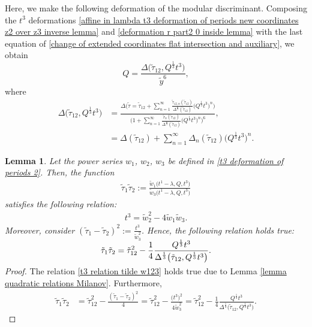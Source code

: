 \documentclass[pdftex]{sigma}
\numberwithin{equation}{section}
\newtheorem{Lemma}[Theorem]{Lemma}
\begin{document}
Here, we make the following deformation of the modular discriminant. Composing the $t^3$ deformations \eqref{affine in lambda t3 deformation of periods new coordinates z2 over z3 inverse lemma} and \eqref{deformation r part2 0 inside lemma} with the last equation of \eqref{change of extended coordinates flat intersection and auxiliary}, we obtain
\[%
Q=\frac{\Delta\bigl(\tilde\tau_{12},Q^{\frac{1}{3}} t^3 \bigr)}{\tilde y^6},
\]
where
\begin{align}
\Delta\bigl(\tilde\tau_{12},Q^{\frac{1}{3}}t^3\bigr)&=\frac{\Delta\bigl(\tilde\tau=\tilde\tau_{12}+\sum_{n=1}^{\infty}\frac{\tilde\tau_{12,n}(\tilde\tau_{12})}{\Delta^{\frac{n}{3}}(\tilde\tau_{12})} \bigl( Q^{\frac{1}{3}}t^3\bigr)^n \bigr)}{\bigl( 1+\sum_{n=1}^{\infty} \frac{\tilde r_n(\tilde\tau_{12})}{\Delta^{\frac{n}{3}}(\tilde\tau_{12})} \bigl( Q^{\frac{1}{3}}t^3 \bigr)^n \bigr)^6},\nonumber\\
&=\Delta(\tilde\tau_{12})+\sum_{n=1}^{\infty} \Delta_n(\tilde\tau_{12})\bigl( Q^{\frac{1}{3}}t^3 \bigr)^n.\label{modular deformation tilde 0}
\end{align}



\begin{Lemma}\label{lemma w1 dependence of t3 e Q root 3}
Let the power series $w_1$, $w_2$, $w_3$ be defined in \eqref{t3 deformation of periods 2}.
Then, the function
\begin{gather*}
\tilde\tau_1\tilde\tau_2:= \frac{\tilde w_1\bigl(t^1-\lambda,Q,t^3\bigr)}{\tilde w_3\bigl(t^1-\lambda,Q,t^3\bigr)}
\end{gather*}
satisfies the following relation:
\begin{gather}\label{t3 relation tilde w123}
t^3=\tilde w_2^2-4\tilde w_1\tilde w_3.
\end{gather}
Moreover, consider
$
(\tilde\tau_1-\tilde\tau_2 )^2:=\frac{t^3}{\tilde w_3^2}$.
Hence, the following relation holds true:
\[
\tilde\tau_1\tilde\tau_2=\tilde\tau_{12}^2-\smash{\frac{1}{4}\frac{Q^{\frac{1}{3}}t^3 }{\Delta^{\frac{1}{3}}\bigl(\tilde\tau_{12},Q^{\frac{1}{3}}t^3\bigr)}}.
\]
\end{Lemma}

\begin{proof}
The relation \eqref{t3 relation tilde w123} holds true due to Lemma \ref{lemma quadratic relations Milanov}. Furthermore,
\begin{align*}
\tilde\tau_1\tilde\tau_2&= \tilde\tau_{12}^2-\frac{( \tilde\tau_1-\tilde\tau_2)^2}{4}= \tilde\tau_{12}^2-\frac{\bigl(t^3\bigr)^2}{4\tilde w_3^2}=\tilde\tau_{12}^2-\frac{1}{4}\frac{Q^{\frac{1}{3}}t^3 }{\Delta^{\frac{1}{3}}\bigl(\tilde\tau_{12},Q^{\frac{1}{3}}t^3\bigr)}.\tag*{\qed}
\end{align*} \renewcommand{\qed}{}
\end{proof}
\end{document}
